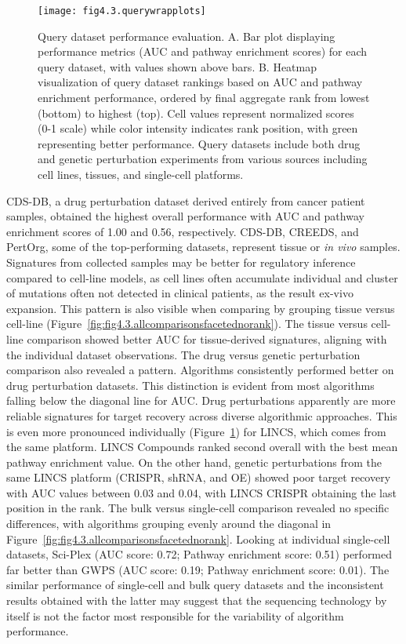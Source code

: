 \begin{figure}[htbp]
    \centering
    \texttt{[image: fig4.3.querywrapplots]}
    \caption[Query dataset performance evaluation.]{Query dataset performance evaluation. A. Bar plot displaying performance metrics (\gls{AUC} and pathway enrichment scores) for each query dataset, with values shown above bars. B. Heatmap visualization of query dataset rankings based on AUC and pathway enrichment performance, ordered by final aggregate rank from lowest (bottom) to highest (top). Cell values represent normalized scores (0-1 scale) while color intensity indicates rank position, with green representing better performance. Query datasets include both drug and genetic perturbation experiments from various sources including cell lines, tissues, and single-cell platforms.}
    \label{fig:fig4.3.querywrapplots}
\end{figure}

\gls{CDS-DB}, a drug perturbation dataset derived entirely from cancer patient samples, obtained the highest overall performance with \gls{AUC} and pathway enrichment scores of 1.00 and 0.56, respectively. \gls{CDS-DB}, \gls{CREEDS}, and PertOrg, some of the top-performing datasets, represent tissue or \textit{in vivo} samples. Signatures from collected samples may be better for regulatory inference compared to cell-line models, as cell lines often accumulate individual and cluster of mutations often not detected in clinical patients, as the result ex-vivo expansion. This pattern is also visible when comparing by grouping tissue versus cell-line (Figure~\ref{fig:fig4.3.allcomparisonsfacetednorank}). The tissue versus cell-line comparison showed better \gls{AUC} for tissue-derived signatures, aligning with the individual dataset observations. The drug versus genetic perturbation comparison also revealed a pattern. Algorithms consistently performed better on drug perturbation datasets. This distinction is evident from most algorithms falling below the diagonal line for \gls{AUC}. Drug perturbations apparently are more reliable signatures for target recovery across diverse algorithmic approaches. This is even more pronounced individually (Figure~\ref{fig:fig4.3.querywrapplots}) for \gls{LINCS}, which comes from the same platform. \gls{LINCS} Compounds ranked second overall with the best mean pathway enrichment value. On the other hand, genetic perturbations from the same \gls{LINCS} platform (\gls{CRISPR}, shRNA, and \gls{OE}) showed poor target recovery with \gls{AUC} values between 0.03 and 0.04, with \gls{LINCS} \gls{CRISPR} obtaining the last position in the rank. 
The bulk versus single-cell comparison revealed no specific differences, with algorithms grouping evenly around the diagonal in Figure~\ref{fig:fig4.3.allcomparisonsfacetednorank}. Looking at individual single-cell datasets, Sci-Plex (\gls{AUC} score: 0.72; Pathway enrichment score: 0.51) performed far better than \gls{GWPS} (\gls{AUC} score: 0.19; Pathway enrichment score: 0.01). The similar performance of single-cell and bulk query datasets and the inconsistent results obtained with the latter may suggest that the sequencing technology by itself is not the factor most responsible for the variability of algorithm performance.

